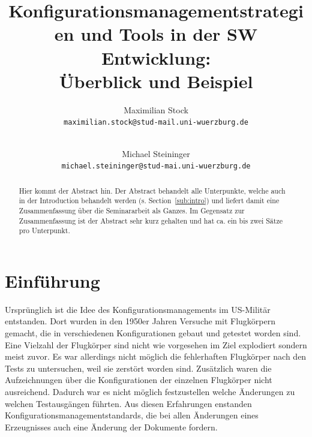 \documentclass[runningheads,a4paper]{uwsese}
\begin{document}
\mainmatter

\title{Konfigurationsmanagementstrategien und Tools in der SW Entwicklung:\\ Überblick und Beispiel}


\author{
  Maximilian Stock\\
  \texttt{maximilian.stock@stud-mail.uni-wuerzburg.de}\\
  \and\\
  Michael Steininger\\
  \texttt{michael.steininger@stud-mai.uni-wuerzburg.de}
}
%



\maketitle


\begin{abstract}
	Hier kommt der Abstract hin. Der Abstract behandelt alle Unterpunkte, welche auch in der Introduction behandelt werden (s. Section~\ref{sub:intro}) und liefert damit eine Zusammenfassung über die Seminararbeit als Ganzes. Im Gegensatz zur Zusammenfassung ist der Abstract sehr kurz gehalten und hat ca. ein bis zwei Sätze pro Unterpunkt.
\end{abstract}


\section{Einführung}
Ursprünglich ist die Idee des Konfigurationsmanagements im US-Militär
entstanden. Dort wurden in den 1950er Jahren Versuche mit Flugkörpern gemacht,
die in verschiedenen Konfigurationen gebaut und getestet worden sind. Eine
Vielzahl der Flugkörper sind nicht wie vorgesehen im Ziel explodiert sondern
meist zuvor. Es war allerdings nicht möglich die fehlerhaften Flugkörper nach
den Tests zu untersuchen, weil sie zerstört worden sind. Zusätzlich waren die
Aufzeichnungen über die Konfigurationen der einzelnen Flugkörper nicht
ausreichend. Dadurch war es nicht möglich festzustellen welche Änderungen zu
welchen Testausgängen führten. Aus diesen Erfahrungen enstanden
Konfigurationsmanagementstandards, die bei allen Änderungen eines Erzeugnisses
auch eine Änderung der Dokumente fordern.
\end{document}

